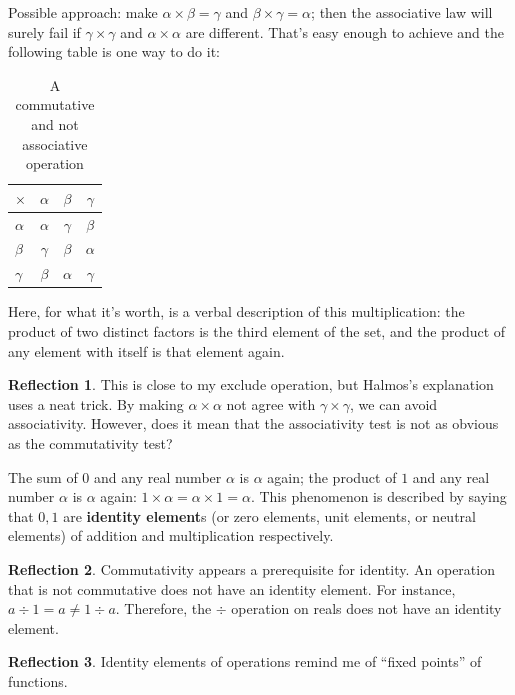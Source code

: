 \documentclass[english,notitlepage,smartquotes]{hgbreport}
\theoremstyle{definition}
\theoremstyle{definition}
\theoremstyle{remark}
\theoremstyle{definition}
\theoremstyle{plain}
\theoremstyle{definition}
\newtheorem{reflection}{Reflection}
\begin{document}
Possible approach: make $\alpha\times\beta=\gamma$ and $\beta\times\gamma=\alpha$; then the associative law will surely fail if $\gamma\times\gamma$ and $\alpha\times\alpha$ are different. That's easy enough to achieve and the following table is one way to do it:

\begin{table}[h!]
\centering
\begin{tabular}{l|ccc}
$\times$&$\alpha$&$\beta$&$\gamma$\\
\hline
$\alpha$&$\alpha$&$\gamma$&$\beta$\\
$\beta$&$\gamma$&$\beta$&$\alpha$\\
$\gamma$&$\beta$&$\alpha$&$\gamma$\\
\end{tabular}
\caption{A commutative and not associative operation}
\label{tab:comnotassoc}
\end{table}
Here, for what it's worth, is a verbal description of this multiplication: the product of two distinct factors is the third element of the set, and the product of any element with itself is that element again.

\begin{reflection}
This is close to my exclude operation, but Halmos's explanation uses a neat trick. By making $\alpha\times\alpha$ not agree with $\gamma\times\gamma$, we can avoid associativity. However, does it mean that the associativity test is not as obvious as the commutativity test?
\end{reflection}

The sum of $0$ and any real number $\alpha$ is $\alpha$ again; the product of $1$ and any real number $\alpha$ is $\alpha$ again: $1\times\alpha=\alpha\times 1=\alpha$. This phenomenon is described by saying that $0,1$ are \textbf{identity element}s (or zero elements, unit elements, or neutral elements) of addition and multiplication respectively. 

\begin{reflection}
Commutativity appears a prerequisite for identity. An operation that is not commutative does not have an identity element. For instance, $a\div 1=a\ne 1\div a$. Therefore, the $\div$ operation on reals does not have an identity element.
\end{reflection}

\begin{reflection}
Identity elements of operations remind me of ``fixed points'' of functions.
\end{reflection}
\end{document}
